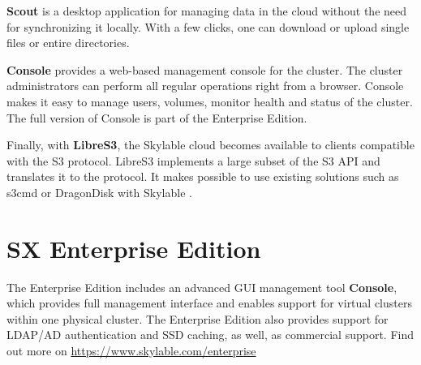 \textbf{\SX Scout} is a desktop application for managing data in the cloud without
the need for synchronizing it locally. With a few clicks, one can download or upload
single files or entire directories.

\textbf{\SX Console} provides a web-based management console for the cluster. The
cluster administrators can perform all regular operations right from a browser.
\SX Console makes it easy to manage users, volumes, monitor health and status
of the cluster. The full version of \SX Console is part of the Enterprise Edition.

Finally, with \textbf{LibreS3}, the Skylable cloud becomes available to clients
compatible with the S3 protocol. LibreS3 implements a large subset of the
S3 API and translates it to the \SX protocol. It makes possible to use
existing solutions such as s3cmd or DragonDisk with Skylable \SX.

\section{SX Enterprise Edition}
The Enterprise Edition includes an advanced GUI management tool \textbf{\SX Console},
which provides full management interface and enables support for virtual clusters
within one physical cluster. The Enterprise Edition also provides support for LDAP/AD
authentication and SSD caching, as well, as commercial support. Find out more on
\url{https://www.skylable.com/enterprise}
